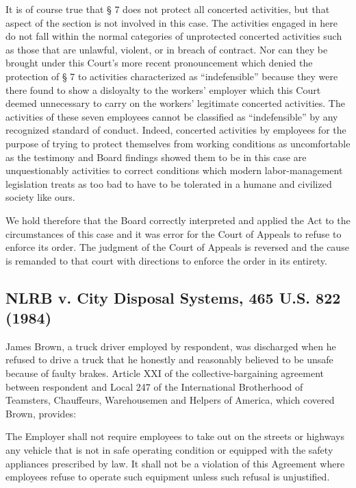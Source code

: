 \documentclass[
  letterpaper,
  11pt,
  DIV=9,
  openright]{scrbook}
\renewenvironment{quote}{
  \list{}{\leftmargin=2em\rightmargin=2em}
  \item\relax\small
}
{\endlist}
\begin{document}
It is of course true that § 7 does not protect all concerted activities,
but that aspect of the section is not involved in this case. The
activities engaged in here do not fall within the normal categories of
unprotected concerted activities such as those that are unlawful,
violent, or in breach of contract. Nor can they be brought under this
Court's more recent pronouncement which denied the protection of § 7 to
activities characterized as ``indefensible'' because they were there
found to show a disloyalty to the workers' employer which this Court
deemed unnecessary to carry on the workers' legitimate concerted
activities. The activities of these seven employees cannot be classified
as ``indefensible'' by any recognized standard of conduct. Indeed,
concerted activities by employees for the purpose of trying to protect
themselves from working conditions as uncomfortable as the testimony and
Board findings showed them to be in this case are unquestionably
activities to correct conditions which modern labor-management
legislation treats as too bad to have to be tolerated in a humane and
civilized society like ours.

We hold therefore that the Board correctly interpreted and applied the
Act to the circumstances of this case and it was error for the Court of
Appeals to refuse to enforce its order. The judgment of the Court of
Appeals is reversed and the cause is remanded to that court with
directions to enforce the order in its entirety.

\subsection{NLRB v. City Disposal Systems, 465 U.S. 822
(1984)}\label{nlrb-v.-city-disposal-systems-465-u.s.-822-1984}

James Brown, a truck driver employed by respondent, was discharged when
he refused to drive a truck that he honestly and reasonably believed to
be unsafe because of faulty brakes. Article XXI of the
collective-bargaining agreement between respondent and Local 247 of the
International Brotherhood of Teamsters, Chauffeurs, Warehousemen and
Helpers of America, which covered Brown, provides:

\begin{quote}
The Employer shall not require employees to take out on the streets or
highways any vehicle that is not in safe operating condition or equipped
with the safety appliances prescribed by law. It shall not be a
violation of this Agreement where employees refuse to operate such
equipment unless such refusal is unjustified.
\end{quote}
\end{document}
